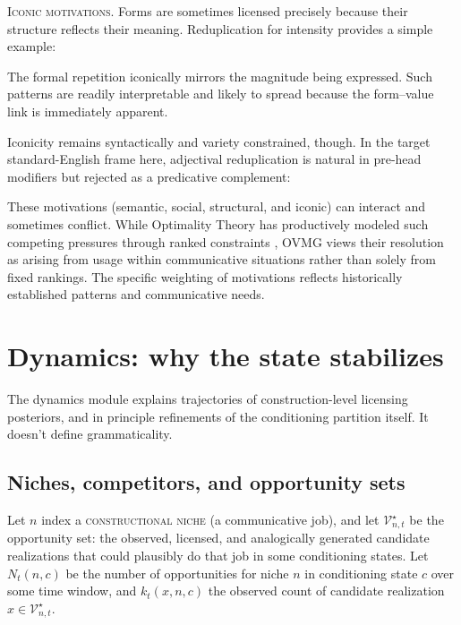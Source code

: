 \documentclass[12pt,letterpaper]{article}
\newcommand{\term}[1]{\textsc{#1}}
\newcommand{\mention}[1]{\textit{#1}}
\begin{document}
\noindent\textsc{Iconic motivations.} Forms are sometimes licensed precisely because their structure reflects their meaning. Reduplication for intensity provides a simple example:
\ea[]{\mention{a big big problem}}\label{ex:big-big-change}
\z

The formal repetition iconically mirrors the magnitude being expressed. Such patterns are readily interpretable and likely to spread because the form--value link is immediately apparent.

Iconicity remains syntactically and variety constrained, though. In the target standard-English frame here, adjectival reduplication is natural in pre-head modifiers but rejected as a predicative complement:
\ea[*]{\mention{the problem was big big}}\label{ex:big-big2-change}
\z

These motivations (semantic, social, structural, and iconic) can interact and sometimes conflict. While Optimality Theory has productively modeled such competing pressures through ranked constraints \autocite{prince2004}, OVMG views their resolution as arising from usage within communicative situations rather than solely from fixed rankings. The specific weighting of motivations reflects historically established patterns and communicative needs.




\section{Dynamics: why the state stabilizes}
\label{sec:dynamics}

The dynamics module explains trajectories of construction-level licensing
posteriors, and in principle refinements of the conditioning partition itself.
It doesn't define grammaticality.

\subsection{Niches, competitors, and opportunity sets}
\label{sec:niches}

Let $n$ index a \term{constructional niche} (a communicative job), and let
$\mathcal{V}_{n,t}^{\star}$ be the opportunity set: the observed, licensed, and
analogically generated candidate realizations that could plausibly do that job in some
conditioning states.
Let $N_t(n,c)$ be the number of opportunities for niche $n$ in conditioning
state $c$ over some time window, and $k_t(x,n,c)$ the observed count of
candidate realization $x\in\mathcal{V}_{n,t}^{\star}$.
\end{document}

